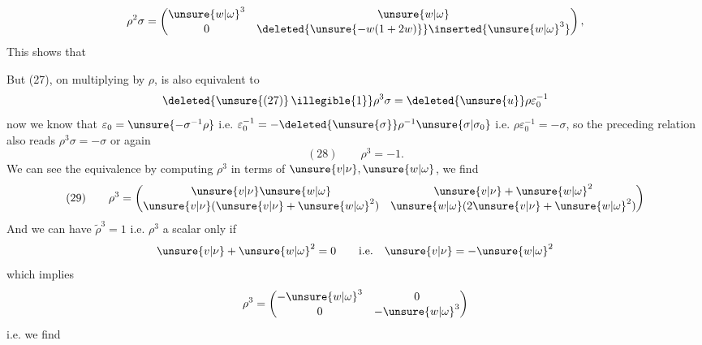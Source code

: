 

\[
\rho^2\sigma=\begin{pmatrix}\unsure{w|\omega}^3&\unsure{w|\omega}\\0&\deleted{\unsure{-w(1+2w)}}\inserted{\unsure{w|\omega}^3}\end{pmatrix},
\]
This shows that
\inserted{
\[
\begin{gathered}(27\mathrm{bis})\qquad
\rho^2\sigma=\varepsilon_0^{-1}\Longleftrightarrow
\left\{\unsure{v|\nu}+\unsure{w|\omega}^2=0,\ \unsure{w|\omega}^3=1\right.
\\[4pt]
\left(\Rightarrow \unsure{v|\nu}=-\unsure{w|\omega}^2=-1/\unsure{w|\omega}\ \text{i.e.}\ \unsure{w|\omega}=-1/\unsure{v|\nu},\ \mathrm{OK}\right)
\end{gathered}\]
}

But (27), on multiplying by $\rho$, is also equivalent to
\[\deleted{\unsure{(27)}\,\illegible{1}}\rho^3\sigma=\deleted{\unsure{u}}\rho\varepsilon_0^{-1}
\]
now we know that $\varepsilon_0=\unsure{-\sigma^{-1}\rho}$  i.e. $\varepsilon_0^{-1}=-\deleted{\unsure{\sigma}}\rho^{-1}\unsure{\sigma|\sigma_0}$
i.e. $\rho\varepsilon_0^{-1}=-\sigma$, so the preceding relation also reads $\rho^3\sigma=-\sigma$ or again
\[
(28)\qquad \boxed{\rho^3=-1}.
\]
We can see  the equivalence  by computing $\rho^3$ in terms of $\unsure{v|\nu},\unsure{w|\omega}$, we find
\[
(29)\qquad
\rho^3=\begin{pmatrix}\unsure{v|\nu}\unsure{w|\omega}&\unsure{v|\nu}+\unsure{w|\omega}^2\\\unsure{v|\nu}(\unsure{v|\nu}+\unsure{w|\omega}^2)&\unsure{w|\omega}(2\unsure{v|\nu}+\unsure{w|\omega}^2)\end{pmatrix}
\]
And we can have $\widetilde\rho^3=1$ i.e. $\rho^3$ a scalar only if 
\[
\unsure{v|\nu}+\unsure{w|\omega}^2=0\qquad\text{i.e.}\quad \unsure{v|\nu}=-\unsure{w|\omega}^2
\]
which implies
\[
\rho^3=\begin{pmatrix}-\unsure{w|\omega}^3&0\\0&-\unsure{w|\omega}^3\end{pmatrix}
\]
i.e. we find

